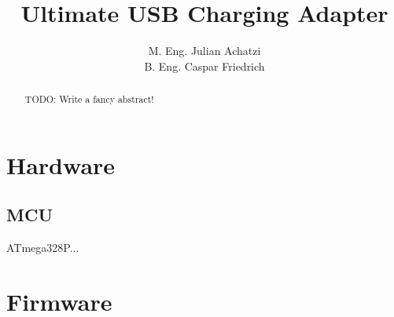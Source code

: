 \documentclass[a4paper]{scrartcl}
\author{M. Eng. Julian Achatzi \\ B. Eng. Caspar Friedrich}
\title{Ultimate USB Charging Adapter}
\begin{document}
\maketitle
\tableofcontents
\newpage

\begin{abstract}
	TODO: Write a fancy abstract!
\end{abstract}

\section{Hardware}

\subsection{MCU}

ATmega328P...

\section{Firmware}
\end{document}
